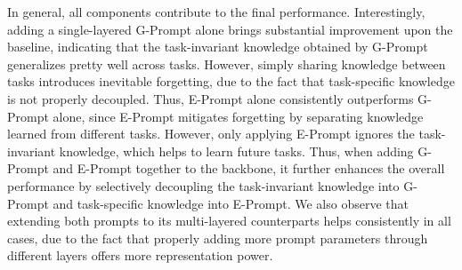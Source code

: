 \documentclass[runningheads]{llncs}
\newcommand{\gprompt}{G-Prompt\xspace}
\newcommand{\eprompt}{E-Prompt\xspace}
\begin{document}
In general, all components contribute to the final performance. 
Interestingly, adding a single-layered \gprompt alone brings substantial improvement upon the baseline, indicating that the task-invariant knowledge obtained by \gprompt generalizes pretty well across tasks. However, simply sharing knowledge between tasks introduces inevitable forgetting, due to the fact that task-specific knowledge is not properly decoupled. Thus, \eprompt alone consistently outperforms \gprompt alone, since \eprompt mitigates forgetting by separating knowledge learned from different tasks. However, only applying \eprompt ignores the task-invariant knowledge, which helps to learn future tasks. Thus, when adding \gprompt and \eprompt together to the backbone, it further enhances the overall performance by selectively decoupling the task-invariant knowledge into \gprompt and task-specific knowledge into \eprompt. We also observe that extending both prompts to its multi-layered counterparts helps consistently in all cases, due to the fact that properly adding more prompt parameters through different layers offers more representation power. 

\end{document}
